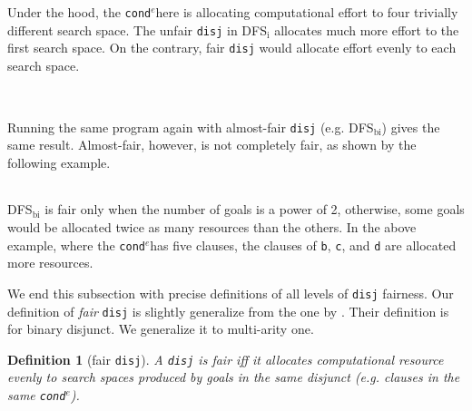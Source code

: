 \documentclass[format=acmlarge, review=true, authordraft=true]{acmart}
\newcommand{\conde}{\texttt{cond$^e$}}
\newcommand{\disj}{\texttt{disj}}
\newcommand{\DFSi}[0]{DFS$_\textrm{i}$}
\newtheorem{defn}{Definition}[section]
\begin{document}
\begin{center}
	\begin{tabular}{c}
		
	\end{tabular}
\end{center}

Under the hood, the \conde here is allocating computational effort to 
four trivially different search space. The unfair \disj{} in 
\DFSi{} allocates much more effort to the first search space. On the contrary, 
fair \disj{} would allocate effort evenly to each search space.

\begin{center}
	\begin{tabular}{c}
		
	\end{tabular}
\end{center}
\begin{center}
\begin{tabular}{c}
	
\end{tabular}
\end{center}

Running the same program again with almost-fair \disj 
(e.g. DFS$_\textrm{bi}$) gives the same result. Almost-fair, however, is not 
completely fair, as shown by the following example. 

\begin{center}
	\begin{tabular}{c}
		
	\end{tabular}
\end{center}

DFS$_\textrm{bi}$ is fair only when the number of goals is a power of 2, 
otherwise, some goals would be allocated twice as many resources than the 
others. In the above example, where the \conde has five clauses, the clauses of 
\texttt{b}, \texttt{c}, and \texttt{d} are allocated more resources.

We end this subsection with precise definitions of all levels of 
\disj{} fairness. Our definition of \emph{fair} \disj{} is slightly generalize 
from the one by \citet{seres1999algebra}. Their definition is for binary 
disjunct. We generalize it to multi-arity one.

\begin{defn}[fair \disj{}]
	A \disj{} is fair iff it allocates computational resource evenly to 
	search spaces produced by goals in the same disjunct (e.g. clauses in the 
	same 
	\conde).
\end{defn}
\end{document}
